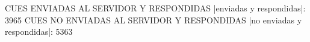 CUES ENVIADAS AL SERVIDOR Y RESPONDIDAS
|enviadas y respondidas|: 3965
CUES NO ENVIADAS AL SERVIDOR Y RESPONDIDAS
|no enviadas y respondidas|: 5363